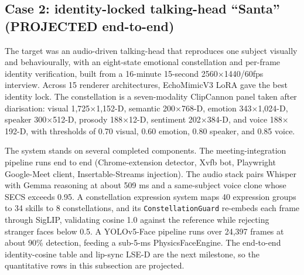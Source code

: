 \documentclass[10pt,twocolumn]{article}
\begin{document}
\subsection{Case 2: identity-locked talking-head ``Santa'' (PROJECTED end-to-end)}
The target was an audio-driven talking-head that reproduces one subject visually
and behaviourally, with an eight-state emotional constellation and per-frame
identity verification, built from a 16-minute 15-second 2560$\times$1440/60fps
interview. Across 15 renderer architectures, EchoMimicV3 LoRA gave the best
identity lock. The constellation is a seven-modality ClipCannon panel taken after
diarisation: visual 1{,}725$\times$1{,}152-D, semantic 200$\times$768-D, emotion
343$\times$1{,}024-D, speaker 300$\times$512-D, prosody 188$\times$12-D, sentiment
202$\times$384-D, and voice 188$\times$192-D, with thresholds of 0.70 visual, 0.60
emotion, 0.80 speaker, and 0.85 voice.

The system stands on several completed components. The meeting-integration pipeline
runs end to end (Chrome-extension detector, Xvfb bot, Playwright Google-Meet
client, Insertable-Streams injection). The audio stack pairs Whisper with Gemma
reasoning at about 509 ms and a same-subject voice clone whose SECS exceeds 0.95. A
constellation expression system maps 40 expression groups to 34 skills to 8
constellations, and its \texttt{ConstellationGuard} re-embeds each frame through
SigLIP, validating cosine 1.0 against the reference while rejecting stranger faces
below 0.5. A YOLOv5-Face pipeline runs over 24{,}397 frames at about 90\% detection,
feeding a sub-5-ms PhysicsFaceEngine. The end-to-end identity-cosine table and
lip-sync LSE-D are the next milestone, so the quantitative rows in this subsection
are projected.
\end{document}
